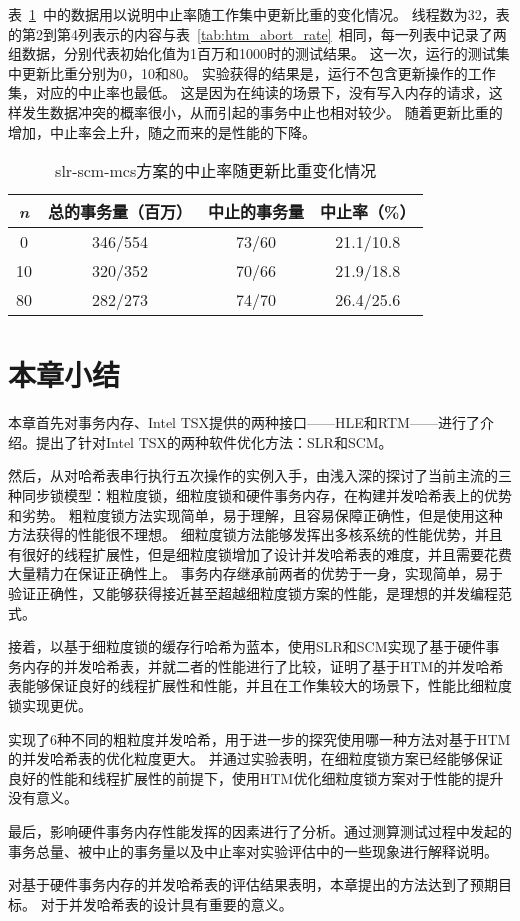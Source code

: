 表~\ref{tab:htm_update}~中的数据用以说明中止率随工作集中更新比重的变化情况。
线程数为32，表的第2到第4列表示的内容与表~\ref{tab:htm_abort_rate}~相同，每一列表中记录了两组数据，分别代表初始化值为1百万和1000时的测试结果。
这一次，运行的测试集中更新比重分别为0，10和80。
实验获得的结果是，运行不包含更新操作的工作集，对应的中止率也最低。
这是因为在纯读的场景下，没有写入内存的请求，这样发生数据冲突的概率很小，从而引起的事务中止也相对较少。
随着更新比重的增加，中止率会上升，随之而来的是性能的下降。

\begin{table}[htbp]
  \centering
  \caption{slr-scm-mcs方案的中止率随更新比重变化情况}
  \label{tab:htm_update}
  \begin{tabular}{cccc}
    \toprule
      \textit{n}  & 总的事务量（百万） & 中止的事务量 & 中止率（\%） \\
    \midrule
      0   &  346/554 & 73/60 & 21.1/10.8  \\
      10  &  320/352 & 70/66 & 21.9/18.8 \\
      80  &  282/273 & 74/70 & 26.4/25.6  \\
    \bottomrule
  \end{tabular}
\end{table}

\section{本章小结}
本章首先对事务内存、Intel TSX提供的两种接口——HLE和RTM——进行了介绍。提出了针对Intel TSX的两种软件优化方法：SLR和SCM。

然后，从对哈希表串行执行五次操作的实例入手，由浅入深的探讨了当前主流的三种同步锁模型：粗粒度锁，细粒度锁和硬件事务内存，在构建并发哈希表上的优势和劣势。
粗粒度锁方法实现简单，易于理解，且容易保障正确性，但是使用这种方法获得的性能很不理想。
细粒度锁方法能够发挥出多核系统的性能优势，并且有很好的线程扩展性，但是细粒度锁增加了设计并发哈希表的难度，并且需要花费大量精力在保证正确性上。
事务内存继承前两者的优势于一身，实现简单，易于验证正确性，又能够获得接近甚至超越细粒度锁方案的性能，是理想的并发编程范式。

接着，以基于细粒度锁的缓存行哈希为蓝本，使用SLR和SCM实现了基于硬件事务内存的并发哈希表，并就二者的性能进行了比较，证明了基于HTM的并发哈希表能够保证良好的线程扩展性和性能，并且在工作集较大的场景下，性能比细粒度锁实现更优。

实现了6种不同的粗粒度并发哈希，用于进一步的探究使用哪一种方法对基于HTM的并发哈希表的优化粒度更大。
并通过实验表明，在细粒度锁方案已经能够保证良好的性能和线程扩展性的前提下，使用HTM优化细粒度锁方案对于性能的提升没有意义。

最后，影响硬件事务内存性能发挥的因素进行了分析。通过测算测试过程中发起的事务总量、被中止的事务量以及中止率对实验评估中的一些现象进行解释说明。

对基于硬件事务内存的并发哈希表的评估结果表明，本章提出的方法达到了预期目标。
对于并发哈希表的设计具有重要的意义。
